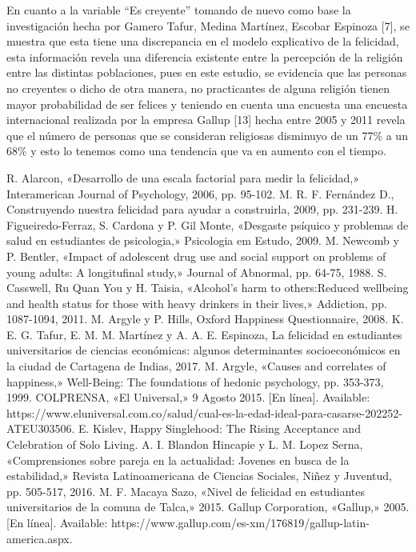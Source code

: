 \documentclass[conference]{IEEEtran}
\begin{document}
   En cuanto a la variable “Es creyente”  tomando de nuevo como base la investigación hecha por Gamero Tafur, Medina Martínez, Escobar Espinoza [7], se muestra que esta tiene una discrepancia en el modelo explicativo de la felicidad, esta información revela una  diferencia existente entre la percepción de la religión entre las  distintas poblaciones, pues en este estudio, se evidencia que las personas no creyentes o dicho de otra manera, no practicantes de alguna religión tienen mayor probabilidad de ser felices y teniendo en cuenta una encuesta una encuesta internacional realizada por la empresa Gallup [13] hecha entre 2005 y 2011 revela que el número de personas que se consideran religiosas disminuyo de un 77\% a un 68\% y esto lo tenemos como una tendencia que va en aumento con el tiempo.




\begin{thebibliography}{99}
 R. Alarcon, «Desarrollo de una escala factorial para medir la felicidad,» Interamerican Journal of Psychology, 2006, pp. 95-102.
	M. R. F. Fernández D., Construyendo nuestra felicidad para ayudar a construirla, 2009, pp. 231-239.
	H. Figueiredo-Ferraz, S. Cardona y P. Gil Monte, «Desgaste psíquico y problemas de salud en estudiantes de psicologia,» Psicologia em Estudo, 2009. 
	M. Newcomb y P. Bentler, «Impact of adolescent drug use and social support on problems of young adults: A longitufinal study,» Journal of Abnormal, pp. 64-75, 1988. 
	S. Casswell, Ru Quan You y H. Taisia, «Alcohol's harm to others:Reduced wellbeing and health status for those with heavy drinkers in their lives,» Addiction, pp. 1087-1094, 2011. 
	M. Argyle y P. Hills, Oxford Happiness Questionnaire, 2008. 
	K. E. G. Tafur, E. M. M. Martínez y A. A. E. Espinoza, La felicidad en estudiantes universitarios de ciencias económicas: algunos determinantes socioeconómicos en la ciudad de Cartagena de Indias, 2017. 
	M. Argyle, «Causes and correlates of happiness,» Well-Being: The foundations of hedonic psychology, pp. 353-373, 1999. 
	COLPRENSA, «El Universal,» 9 Agosto 2015. [En línea]. Available: https://www.eluniversal.com.co/salud/cual-es-la-edad-ideal-para-casarse-202252-ATEU303506.
	E. Kislev, Happy Singlehood: The Rising Acceptance and Celebration of Solo Living. 
	A. I. Blandon Hincapie y L. M. Lopez Serna, «Comprensiones sobre pareja en la actualidad: Jovenes en busca de la estabilidad,» Revista Latinoamericana de Ciencias Sociales, Niñez y Juventud, pp. 505-517, 2016. 
	M. F. Macaya Sazo, «Nivel de felicidad en estudiantes universitarios de la comuna de Talca,» 2015. 
	Gallup Corporation, «Gallup,» 2005. [En línea]. Available: https://www.gallup.com/es-xm/176819/gallup-latin-america.aspx.









\end{thebibliography}
\end{document}
